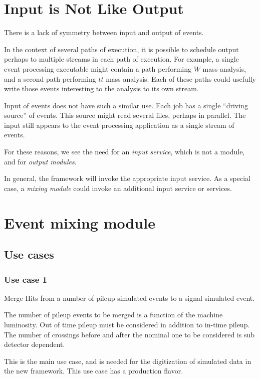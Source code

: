 \documentclass[draftmode]{memarticle}
\begin{document}
\section{Input is Not Like Output}\label{s:inputandoutput}

There is a lack of symmetry between input and output of events.

In the context of several paths of execution,
it is possible to schedule output
perhaps to multiple streams
in each path of execution.
For example,
a single event processing executable
might contain a path performing $W$ mass analysis,
and a second path performing $t\bar{t}$ mass analysis.
Each of these paths could usefully write those events interesting to the analysis
to its own stream.

Input of events does not have such a similar use.
Each job has a single ``driving source'' of events.
This source might read several files,
perhaps in parallel.
The input still appears to the event processing application
as a single stream of events.

For these reasons,
we see the need for an \emph{input service},
which is not a module,
and for \emph{output modules}.

In general,
the framework will invoke the appropriate input service.
As a special case,
a \emph{mixing module} could invoke
an additional input service or services.

\section{Event mixing module}

\subsection{Use cases}

\subsubsection {Use case 1}

Merge Hits from a number of pileup simulated events to a signal simulated event.

The number of pileup events to be merged is a function of the machine luminosity.
Out of time pileup must be considered in addition to in-time pileup. The number of crossings before and after the nominal one to be considered is sub detector dependent.

This is the main use case, and is needed for the digitization of simulated data in the new framework.
This use case has a production flavor.
\end{document}
